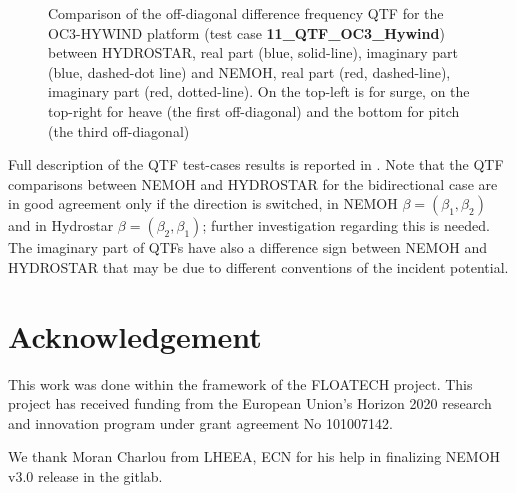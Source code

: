\documentclass[12pt,a4paper,titlepage]{article}
\begin{document}
\begin{figure}[ht!]
{}
	\caption{Comparison of the off-diagonal difference frequency QTF for the OC3-HYWIND platform (test case \textbf{11\_QTF\_OC3\_Hywind}) between HYDROSTAR, real part (blue, solid-line), imaginary part (blue, dashed-dot line) and NEMOH, real part (red, dashed-line), imaginary part (red, dotted-line). On the top-left is for surge, on the top-right for heave (the first off-diagonal) and the bottom for pitch (the third off-diagonal)}\label{fig:QTFM_diag_OC3_HYWIND}
\end{figure}

Full description of the QTF test-cases results is reported in \citep{Kurnia22_JH,Kurnia22}. Note that the QTF comparisons between NEMOH and HYDROSTAR for the bidirectional case are in good agreement only if the direction is switched, in NEMOH $\beta=(\beta_1,\beta_2)$ and in Hydrostar $\beta=(\beta_2,\beta_1)$; further investigation regarding this is needed. The imaginary part of QTFs have also a difference sign between NEMOH and HYDROSTAR that may be due to different conventions of the incident potential. 

\FloatBarrier

\section*{Acknowledgement}
This work was done within the framework of the FLOATECH project. This project has received funding from the European Union’s Horizon 2020 research and innovation program under grant agreement No 101007142.

We thank Moran Charlou from LHEEA, ECN for his help in finalizing NEMOH v3.0 release in the gitlab.




\end{document}

